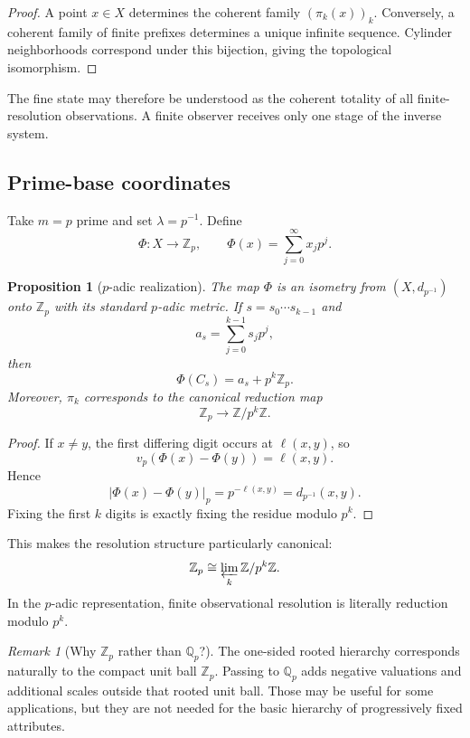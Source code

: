 \documentclass[11pt]{article}
\newtheorem{proposition}[theorem]{Proposition}
\theoremstyle{definition}
\theoremstyle{remark}
\newtheorem{remark}[theorem]{Remark}
\newcommand{\Z}{\mathbb Z}
\newcommand{\Zp}{\mathbb Z_p}
\newcommand{\Qp}{\mathbb Q_p}
\newcommand{\cyl}[1]{C_{#1}}
\begin{document}
\begin{proof}
A point $x\in X$ determines the coherent family $(\pi_k(x))_k$.  Conversely, a coherent family of finite prefixes determines a unique infinite sequence.  Cylinder neighborhoods correspond under this bijection, giving the topological isomorphism.
\end{proof}

The fine state may therefore be understood as the coherent totality of all finite-resolution observations.  A finite observer receives only one stage of the inverse system.

\subsection{Prime-base coordinates}

Take $m=p$ prime and set $\lambda=p^{-1}$.  Define
\[
\Phi:X\to\Zp,
\qquad
\Phi(x)=\sum_{j=0}^{\infty}x_jp^j.
\]

\begin{proposition}[$p$-adic realization]\label{prop:padic}
The map $\Phi$ is an isometry from $(X,d_{p^{-1}})$ onto $\Zp$ with its standard $p$-adic metric.  If $s=s_0\cdots s_{k-1}$ and
\[
a_s=\sum_{j=0}^{k-1}s_jp^j,
\]
then
\[
\Phi(\cyl{s})=a_s+p^k\Zp.
\]
Moreover, $\pi_k$ corresponds to the canonical reduction map
\[
\Zp\longrightarrow \Z/p^k\Z.
\]
\end{proposition}

\begin{proof}
If $x\ne y$, the first differing digit occurs at $\ell(x,y)$, so
\[
v_p(\Phi(x)-\Phi(y))=\ell(x,y).
\]
Hence
\[
|\Phi(x)-\Phi(y)|_p=p^{-\ell(x,y)}=d_{p^{-1}}(x,y).
\]
Fixing the first $k$ digits is exactly fixing the residue modulo $p^k$.
\end{proof}

This makes the resolution structure particularly canonical:
\[
\Zp\cong\varprojlim_k\Z/p^k\Z.
\]
In the $p$-adic representation, finite observational resolution is literally reduction modulo $p^k$.

\begin{remark}[Why $\Zp$ rather than $\Qp$?]
The one-sided rooted hierarchy corresponds naturally to the compact unit ball $\Zp$.  Passing to $\Qp$ adds negative valuations and additional scales outside that rooted unit ball.  Those may be useful for some applications, but they are not needed for the basic hierarchy of progressively fixed attributes.
\end{remark}
\end{document}
